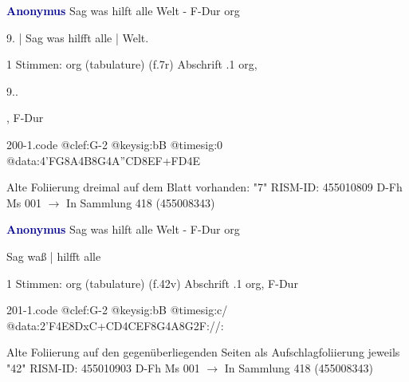 \documentclass[twocolumn]{book}
\begin{document}
\newline \par \vspace{7pt} \textcolor{darkblue}{\textbf{Anonymus  }}
\newline Sag was hilft alle Welt - F-Dur
\newline org
\newline \begin{itshape}[f.7r, at left:] 9. | Sag was hilfft alle | Welt.\end{itshape} 
\newline \textcolor{darkblue}{}  1 Stimmen: org (tabulature)  (f.7r)
\newline Abschrift
.1  org, \begin{itshape}9..\end{itshape}, F-Dur  
\begin{filecontents*}{200-1.code}
@clef:G-2
@keysig:bB
@timesig:0
@data:4'FG8A4B8G4A''CD{8EF+}{FD}4E
\end{filecontents*}
\newline
%
\newline Alte Foliierung dreimal auf dem Blatt vorhanden: "7"
\newline RISM-ID: 455010809
\newline D-Fh  Ms 001
\newline $\rightarrow$ In Sammlung 418 (455008343)
      
\newline \par \vspace{7pt} \textcolor{darkblue}{\textbf{Anonymus  }}
\newline Sag was hilft alle Welt - F-Dur
\newline org
\newline \begin{itshape}[f.42v, at left:] Sag waß | hilfft alle\end{itshape} 
\newline \textcolor{darkblue}{}  1 Stimmen: org (tabulature)  (f.42v)
\newline Abschrift
.1  org, F-Dur  
\begin{filecontents*}{201-1.code}
@clef:G-2
@keysig:bB
@timesig:c/
@data:2'F4E{8DxC+}{CD}4CEF8G4A8G2F://:
\end{filecontents*}
\newline
%
\newline Alte Foliierung auf den gegenüberliegenden Seiten als Aufschlagfoliierung jeweils "42"
\newline RISM-ID: 455010903
\newline D-Fh  Ms 001
\newline $\rightarrow$ In Sammlung 418 (455008343)
      
\end{document}
